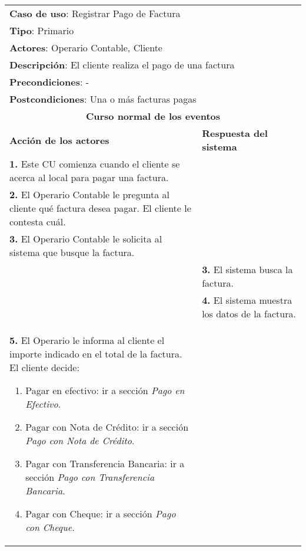 \documentclass[12pt]{extarticle}
\begin{document}
	\begin{longtable}{ |p{8cm}|p{8cm}| }
		\hline
		\multicolumn{2}{|p{16cm}|}{\textbf{Caso de uso}: Registrar Pago de Factura}\\
		\multicolumn{2}{|p{16cm}|}{\textbf{Tipo}: Primario}\\
		\multicolumn{2}{|p{16cm}|}{\textbf{Actores}: Operario Contable, Cliente}\\
		\multicolumn{2}{|p{16cm}|}{\textbf{Descripción}: El cliente realiza el pago de una factura}\\
		\multicolumn{2}{|p{16cm}|}{\textbf{Precondiciones}: -}\\
		\multicolumn{2}{|p{16cm}|}{\textbf{Postcondiciones}: Una o más facturas pagas}\\
		\hline
		\multicolumn{2}{|c|}{\textbf{Curso normal de los eventos}}\\
		\hline
		\textbf{Acción de los actores} & \textbf{Respuesta del sistema}\\
		\hline
			\textbf{1. }Este CU comienza cuando el cliente se acerca al local para pagar una factura.& \\
            \hline
			\textbf{2. }El Operario Contable le pregunta al cliente qué factura desea pagar. El cliente le contesta cuál. & \\
            \hline
			\textbf{3. }El Operario Contable le solicita al sistema que busque la factura. & \\
            \hline
			& \textbf{3. }El sistema busca la factura. \\
            \hline
			& \textbf{4. }El sistema muestra los datos de la factura. \\
            \hline
			\textbf{5. }El Operario le informa al cliente el importe indicado en el total de la factura. El cliente decide:
                \begin{enumerate}[label=(\alph*)]
                    \item Pagar en efectivo: ir a sección \textit{Pago en Efectivo}.
                    \item Pagar con Nota de Crédito: ir a sección \textit{Pago con Nota de Crédito}.
                    \item Pagar con Transferencia Bancaria: ir a sección \textit{Pago con Transferencia Bancaria}.
                    \item Pagar con Cheque: ir a sección \textit{Pago con Cheque}.

\end{enumerate}
\end{longtable}
\end{document}
